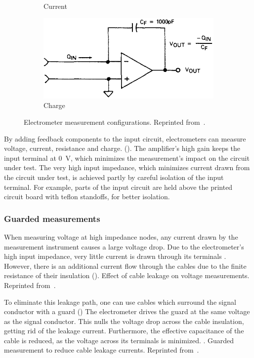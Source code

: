 \begin{figure}[p]
\begin{subfigure}[b]{\textwidth}
        \caption{Current}
    \end{subfigure}
    \begin{subfigure}[b]{\textwidth}
    \centering
        \includegraphics{figuras/instrumental/617coulombs.png}
        \caption{Charge}
    \end{subfigure}
    \caption{Electrometer measurement configurations.
    Reprinted from~\cite{keithley_instruments_inc._keithley_1984}.}
    \label{fig:keithley617}
\end{figure}
By adding feedback components to the input circuit,
electrometers can measure voltage, current, resistance and charge.
().
The amplifier's high gain keeps the input terminal at 
\SI{0}{\volt}, 
which minimizes the measurement's impact on the circuit under test.
The very high input impedance,
which minimizes current drawn from the circuit under test,
is achieved partly by careful isolation of the input terminal.
For example, parts of the input circuit 
are held above the printed circuit board with teflon standoffs,
for better isolation.
\subsubsection{Guarded measurements}
When measuring voltage at high impedance nodes,
any current drawn by the measurement instrument causes a large voltage drop.
Due to the electrometer's high input impedance,
very little current is drawn through its terminals .
However, there is an additional current flow through the cables
due to the finite resistance of their insulation
().
{Effect of cable leakage on voltage measurements.
    Reprinted from~\cite{keithley_instruments_inc._keithley_1984}.}

To eliminate this leakage path,
one can use cables which surround the signal conductor with a guard ()
The electrometer drives the guard at the same voltage as the signal conductor.
This nulls the voltage drop across the cable insulation,
getting rid of the leakage current.
Furthermore, the effective capacitance of the cable is reduced,
as the voltage across its terminals is minimized.
\cite{rich_shielding_1983}.
{Guarded measurement to reduce cable leakage currents.
    Reprinted from~\cite{keithley_instruments_inc._keithley_1984}.}
